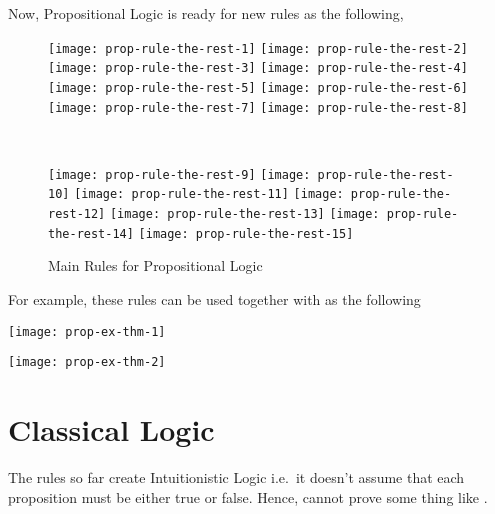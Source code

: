 \documentclass[master.tex]{subfiles}
\begin{document}
Now, Propositional Logic is ready for new rules as the following,

\begin{figure}[H]
    \centering

\begin{minipage}{0.48\textwidth}
\begin{flushleft}
\texttt{[image: prop-rule-the-rest-1]}
\texttt{[image: prop-rule-the-rest-2]}
\texttt{[image: prop-rule-the-rest-3]}
\texttt{[image: prop-rule-the-rest-4]}
\texttt{[image: prop-rule-the-rest-5]}
\texttt{[image: prop-rule-the-rest-6]}
\texttt{[image: prop-rule-the-rest-7]}
\texttt{[image: prop-rule-the-rest-8]}
\end{flushleft}
\end{minipage}
~
\begin{minipage}{0.48\textwidth}
\begin{flushright}
\texttt{[image: prop-rule-the-rest-9]}
\texttt{[image: prop-rule-the-rest-10]}
\texttt{[image: prop-rule-the-rest-11]}
\texttt{[image: prop-rule-the-rest-12]}
\texttt{[image: prop-rule-the-rest-13]}
\texttt{[image: prop-rule-the-rest-14]}
\texttt{[image: prop-rule-the-rest-15]}
\end{flushright}
\end{minipage}

    \caption{Main Rules for Propositional Logic}
\label{fig:prop-rule-main-rules}
\end{figure}

For example, these rules can be used together with  as the
following

\begin{center}
  \texttt{[image: prop-ex-thm-1]}
\end{center}
\begin{center}
  \texttt{[image: prop-ex-thm-2]}
\end{center}

\section{Classical Logic}

The rules so far create Intuitionistic Logic i.e.\ it doesn't assume that each
proposition must be either true or false. Hence, cannot prove some thing like
.
\end{document}
